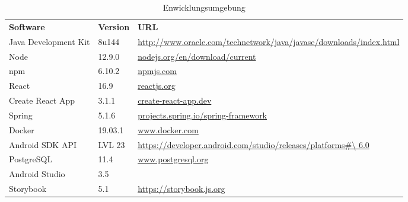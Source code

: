 \begin{table}[h]
	\centering
	\begin{tabularx}{\textwidth}{l l X}
		\rowcolor[HTML]{C0C0C0} 
		\textbf{Software} & \textbf{Version} & \textbf{URL} \\
		Java Development Kit & 8u144 & \url{http://www.oracle.com/technetwork/java/javase/downloads/index.html} \\
		\rowcolor[HTML]{E7E7E7} 
		Node & 12.9.0 & \url{nodejs.org/en/download/current} \\
		npm & 6.10.2 & \url{npmjs.com} \\
		\rowcolor[HTML]{E7E7E7} 
		React &16.9 &\url{reactjs.org}\\
		Create React App & 3.1.1 & \url{create-react-app.dev} \\
		\rowcolor[HTML]{E7E7E7} 
		Spring & 5.1.6 & \url{projects.spring.io/spring-framework} \\
		Docker & 19.03.1& \url{www.docker.com} \\
		\rowcolor[HTML]{E7E7E7} 
		Android SDK API&LVL 23 & \url {https://developer.android.com/studio/releases/platforms\#\ 6.0} \\
		PostgreSQL &11.4 & \url{www.postgresql.org} \\
		\rowcolor[HTML]{E7E7E7}
		Android Studio & 3.5 & \utl{https://developer.android.com/studio} \\
		Storybook & 5.1 &\url {https://storybook.js.org} \\
		
	\end{tabularx}
	\caption{Enwicklungsumgebung}
	\label{table:entwicklungsumgebung}
\end{table}